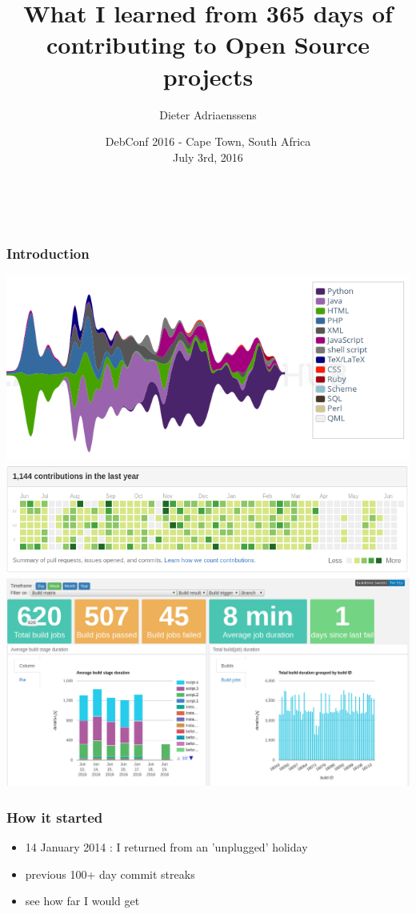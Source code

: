 \documentclass[14pt]{beamer}
\title[365 days of Open Source]{What I learned from 365 days of contributing to Open Source projects}
\author{Dieter Adriaenssens}
\institute[]{Open Source developer - @dcadriaenssens}
\date[DebConf16 3Jul2016]{DebConf 2016 - Cape Town, South Africa\\
July 3rd, 2016}
\begin{document}
  \begin{frame}
    \titlepage
    \vfill
    \begin{center}
      \\[2.5ex]
        {\tiny\CcNote{\CcLongnameByNcSa}}
        \vspace*{-2.5ex}
    \end{center}
  \end{frame}
  \begin{frame}
    \frametitle{Introduction}
    \includegraphics[scale=.3]{openhub.png}
    \includegraphics[scale=.3]{github_19jun2016.png}\\
    \includegraphics[scale=.3]{screenshot_buildtimetrend.png}
  \end{frame}
  \begin{frame}
    \frametitle{How it started}
    \begin{itemize}
      \item 14 January 2014 : I returned from an 'unplugged' holiday
      \item previous 100+ day commit streaks
      \item see how far I would get
    \end{itemize}
  \end{frame}
\end{document}

